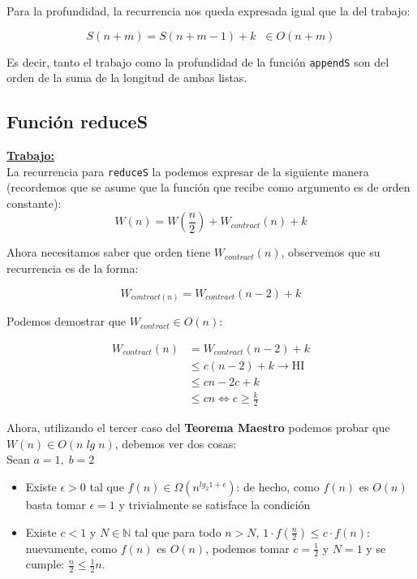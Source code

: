 \documentclass[11pt]{article}
\begin{document}
Para la profundidad, la recurrencia nos queda expresada igual que la del
trabajo:

\begin{equation*}
    S(n + m) = S(n + m - 1) + k \; \; \in O(n + m)
\end{equation*}

Es decir, tanto el trabajo como la profundidad de la función \texttt{appendS}
son del orden de la suma de la longitud de ambas listas.


\subsection*{Función reduceS}

\textbf{\underline{Trabajo:}} \\

La recurrencia para \texttt{reduceS} la podemos expresar de la siguiente manera
(recordemos que se asume que la función que recibe como argumento es de orden constante):
\begin{equation*}
    W(n) = W(\frac{n}{2}) + W_{contract}(n) + k
\end{equation*}

Ahora necesitamos saber que orden tiene $W_{contract}(n)$, observemos que su 
recurrencia es de la forma:

\begin{equation*}
    W_{contract(n)} = W_{contract}(n-2) + k 
\end{equation*}

Podemos demostrar que $W_{contract} \in O(n)$:

\begin{align*}
    W_{contract}(n) & = W_{contract}(n - 2) + k \\
             & \leq c(n - 2) + k \rightarrow \text{HI}\\
             & \leq cn - 2c + k \\
             & \leq cn \iff c \geq \frac{k}{2}
\end{align*}

Ahora, utilizando el tercer caso del \textbf{Teorema Maestro} podemos probar que
$W(n) \in O(n \;lg\;n)$, debemos ver dos cosas: \\

Sean $a = 1, \; b = 2$

\begin{itemize}
    \item Existe $\epsilon > 0$ tal que $f(n) \in \Omega(n^{lg_2 1 + \epsilon})$:
          de hecho, como $f(n)$ es $O(n)$ basta tomar $\epsilon = 1$
          y trivialmente se satisface la condición
    \item  Existe $c < 1$ y $N \in \mathbb{N}$ tal que para todo $n > N$,
           $1 \cdot f(\frac{n}{2}) \leq c \cdot f(n)$: nuevamente, como $f(n)$ es $O(n)$, 
           podemos tomar $c = \frac{1}{2}$ y $N = 1$ y se cumple: $\frac{n}{2} \leq \frac{1}{2}n$. 
\end{itemize}
\end{document}
